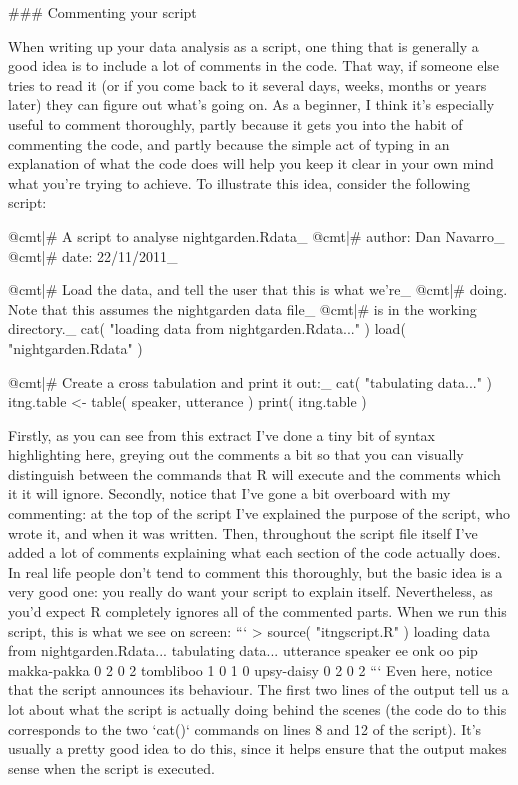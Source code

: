 ### Commenting your script

When writing up your data analysis as a script, one thing that is generally a good idea is to include a lot of comments in the code. That way, if someone else tries to read it (or if you come back to it several days, weeks, months or years later) they can figure out what's going on. As a beginner, I think it's especially useful to comment thoroughly, partly because it gets you into the habit of commenting the code, and partly because the simple act of typing in an explanation of what the code does will help you keep it clear in your own mind what you're trying to achieve. To illustrate this idea, consider the following script:

\begin{script}
@cmt|# A script to analyse nightgarden.Rdata_
@cmt|#  author: Dan Navarro_
@cmt|#  date: 22/11/2011_

@cmt|# Load the data, and tell the user that this is what we're_
@cmt|# doing. Note that this assumes the nightgarden data file_ 
@cmt|# is in the working directory._
cat( "loading data from nightgarden.Rdata...\n" )
load( "nightgarden.Rdata" )

@cmt|# Create a cross tabulation and print it out:_
cat( "tabulating data...\n" )
itng.table <- table( speaker, utterance )
print( itng.table )
\end{script}
Firstly, as you can see from this extract I've done a tiny bit of syntax highlighting here, greying out the comments a bit so that you can visually distinguish between the commands that R will execute and the comments which it it will ignore. Secondly, notice that I've gone a bit overboard with my commenting: at the top of the script I've explained the purpose of the script, who wrote it, and when it was written. Then, throughout the script file itself I've added a lot of comments explaining what each section of the code actually does. In real life people don't tend to comment this thoroughly, but the basic idea is a very good one: you really do want your script to explain itself.  Nevertheless, as you'd expect R completely ignores all of the commented parts. When we run this script, this is what we see on screen:
```
> source( "itngscript.R" )
loading data from nightgarden.Rdata...
tabulating data...
             utterance
speaker       ee onk oo pip
  makka-pakka  0   2  0   2
  tombliboo    1   0  1   0
  upsy-daisy   0   2  0   2
```
Even here, notice that the script announces its behaviour. The first two lines of the output tell us a lot about what the script is actually doing behind the scenes (the code do to this corresponds to the two `cat()` commands on lines 8 and 12 of the script). It's usually a pretty good idea to do this, since it helps ensure that the output makes sense when the script is executed. 

